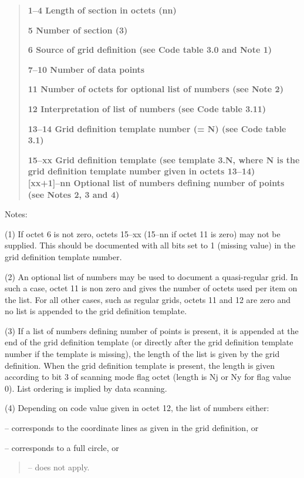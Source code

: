 \begin{quote}
\textbf{1--4 Length of section in octets (nn)}

\textbf{5 Number of section (3)}

\textbf{6 Source of grid definition (see Code table 3.0 and Note 1)}

\textbf{7--10 Number of data points}

\textbf{11 Number of octets for optional list of numbers (see Note 2)}

\textbf{12 Interpretation of list of numbers (see Code table 3.11)}

\textbf{13--14 Grid definition template number (= N) (see Code table 3.1)}

\textbf{15--xx Grid definition template (see template 3.N, where N is the grid definition template number given in octets 13--14)\\
{[}xx+1{]}--nn Optional list of numbers defining number of points (see Notes 2, 3 and 4)}
\end{quote}

Notes:

(1) If octet 6 is not zero, octets 15--xx (15--nn if octet 11 is zero) may not be supplied. This should be documented with all bits set to 1 (missing value) in the grid definition template number.

(2) An optional list of numbers may be used to document a quasi-regular grid. In such a case, octet 11 is non zero and gives the number of octets used per item on the list. For all other cases, such as regular grids, octets 11 and 12 are zero and no list is appended to the grid definition template.

(3) If a list of numbers defining number of points is present, it is appended at the end of the grid definition template (or directly after the grid definition template number if the template is missing), the length of the list is given by the grid definition. When the grid definition template is present, the length is given according to bit 3 of scanning mode flag octet (length is Nj or Ny for flag value 0). List ordering is implied by data scanning.

(4) Depending on code value given in octet 12, the list of numbers either:

-- corresponds to the coordinate lines as given in the grid definition, or

-- corresponds to a full circle, or

\begin{quote}
-- does not apply.
\end{quote}

